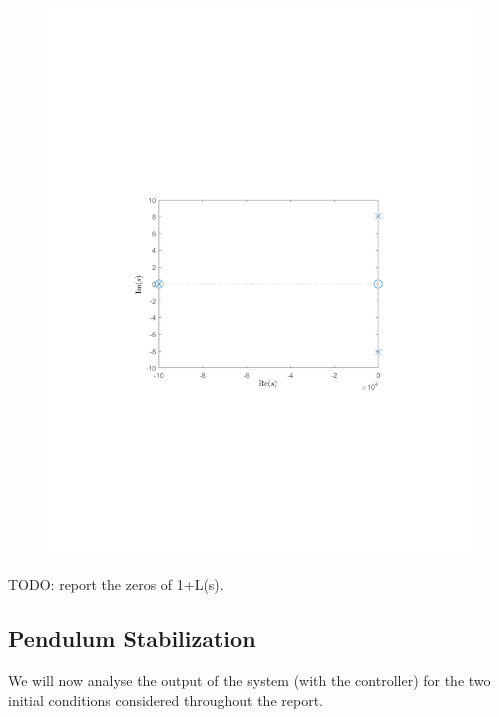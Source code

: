 \documentclass[10pt]{article}
\begin{document}
\begin{figure}[ht]
\begin{minipage}[b]{0.45\textwidth}
        \includegraphics[clip, trim=4.3cm 8.3cm 4.5cm 9.3cm,width=1\linewidth]{lab1/figs/section7_pole_zero_cls.pdf}
    \end{minipage}
\end{figure}

TODO: report the zeros of 1+L(s).

\subsection{Pendulum Stabilization}

We will now analyse the output of the system (with the controller) for the two initial conditions considered throughout the report. 
\end{document}

